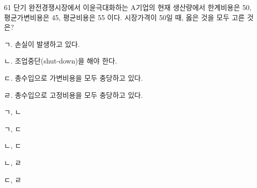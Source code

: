 \begin{question}{61}
단기 완전경쟁시장에서 이윤극대화하는 A기업의 현재 생산량에서 한계비용은 50, 평균가변비용은 45, 평균비용은 55 이다. 시장가격이 50일 때, 옳은 것을 모두 고른 것은?
\begin{framedtext}
ㄱ. 손실이 발생하고 있다. \par
ㄴ. 조업중단(shut-down)을 해야 한다. \par
ㄷ. 총수입으로 가변비용을 모두 충당하고 있다. \par
ㄹ. 총수입으로 고정비용을 모두 충당하고 있다. \par
\end{framedtext}
\begin{choices}
  \item ㄱ, ㄴ
  \item ㄱ, ㄷ
  \item ㄴ, ㄷ
  \item ㄴ, ㄹ
  \item ㄷ, ㄹ
\end{choices}
\end{question}
